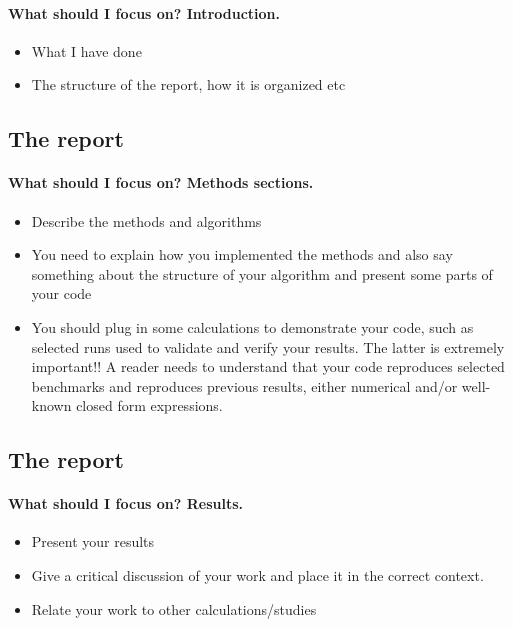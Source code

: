 \documentclass[%
twoside,                 %
final,                   %
10pt]{article}
\newenvironment{paragraphadmon}[1][]{\paragraph{#1}}{}
\begin{document}
{{{{{{{{{\begin{paragraphadmon}[What should I focus on? Introduction.]
\begin{itemize}
 \item What I have done

 \item The structure of the report, how it is organized etc
\end{itemize}

\noindent
\end{paragraphadmon}




\subsection{The report}

\begin{paragraphadmon}[What should I focus on? Methods sections.]
\begin{itemize}
 \item Describe the methods and algorithms

 \item You need to explain how you implemented the methods and also say something about the structure of your algorithm and present some parts of your code

 \item You should plug in some calculations to demonstrate your code, such as selected runs used to validate and verify your results. The latter is extremely important!!  A reader needs to understand that your code reproduces selected benchmarks and reproduces previous results, either numerical and/or well-known  closed form expressions.
\end{itemize}

\noindent
\end{paragraphadmon}




\subsection{The report}

\begin{paragraphadmon}[What should I focus on? Results.]
\begin{itemize}
 \item Present your results

 \item Give a critical discussion of your work and place it in the correct context.

 \item Relate your work to other calculations/studies


\end{itemize}
\end{paragraphadmon}}}}}}}}}}
\end{document}

